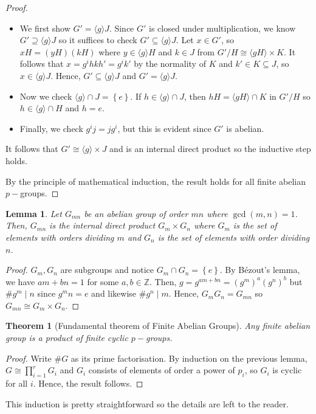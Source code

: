 \documentclass[letterpaper,12pt]{article}
\newcommand{\set}[1]{\left\{ #1 \right\}}
\newtheorem{lemma}{Lemma}[section]
\newtheorem{theorem}{Theorem}[section]
\begin{document}
\begin{enumerate}
\begin{proof}
\begin{itemize}
\begin{itemize}
\begin{itemize}
                    \item We first show $G' = \langle g \rangle J$. Since $G'$ is closed under multiplication, we know $G' \supseteq \langle g \rangle J$ so it suffices to check $G' \subseteq \langle g \rangle J$. Let $x \in G'$, so $xH = (yH)(kH)$ where $y \in \langle g \rangle H$ and $k \in J$ from $G'/H \cong \langle gH \rangle \times K$. It follows that $x=g^ihkh' = g^ik'$ by the normality of $K$ and $k' \in K \subseteq J$, so $x \in \langle g \rangle J$. Hence, $G' \subseteq \langle g \rangle J$ and $G' = \langle g \rangle J$.
                    \item Now we check $\langle g \rangle \cap J = \set{e}$. If $h \in \langle g \rangle \cap J$, then $hH = \langle gH \rangle \cap K$ in $G'/H$ so $h \in \langle g \rangle \cap H$ and $h = e$.
                    \item Finally, we check $g^i j = jg^i$, but this is evident since $G'$ is abelian.
                \end{itemize}
                It follows that $G' \cong \langle g \rangle \times J$ and is an internal direct product so the inductive step holds.
                \end{itemize}
        \end{itemize}
        By the principle of mathematical induction, the result holds for all finite abelian $p-$groups.
    \end{proof}
\end{enumerate}
    \begin{lemma}
        Let $G_{mn}$ be an abelian group of order $mn$ where $\gcd (m,n) = 1$. Then, $G_{mn}$ is the internal direct product $G_m \times G_n$ where $G_m$ is the set of elements with orders dividing $m$ and $G_n$ is the set of elements with order dividing $n$.
    \end{lemma}
    \begin{proof}
        $G_m,G_n$ are subgroups and notice $G_m \cap G_n = \set{e}$. By Bézout's lemma, we have $am + bn = 1$ for some $a,b \in \mathbb{Z}$. Then, $g = g^{am + bn}=(g^m)^a(g^n)^b$ but $\# g^m \mid n$ since $g^mn = e$ and likewise $\#g^n \mid m$. Hence, $G_mG_n = G_{mn}$ so $G_{mn} \cong G_m \times G_n$.
    \end{proof}
    \begin{theorem}[Fundamental theorem of Finite Abelian Groups]
        Any finite abelian group is a product of finite cyclic $p-$groups.
    \end{theorem}
    \begin{proof}
        Write $\# G$ as its prime factorisation. By induction on the previous lemma, $G \cong \prod_{i = 1}^r G_i$ and $G_i$ consists of elements of order a power of $p_i$, so $G_i$ is cyclic for all $i$. Hence, the result follows.
    \end{proof}
    This induction is pretty straightforward so the details are left to the reader.
\end{document}
